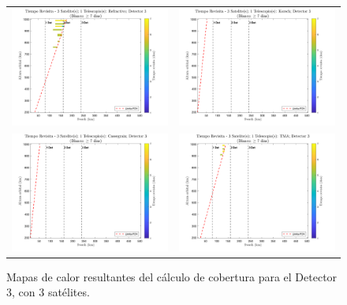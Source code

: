 \begin{landscape}
\begin{figure}[p]
\centering
\vspace*{0.3cm}
\setlength{\tabcolsep}{4pt}
\renewcommand{\arraystretch}{0}
\begin{tabular}{cc}
\includegraphics[width=0.48\linewidth]{4.Payload/Coverage/heatmap_3 Satelite(s); 1 Telescopio(s): Refractivo; Detector 3.jpg} &
\includegraphics[width=0.48\linewidth]{4.Payload/Coverage/heatmap_3 Satelite(s); 1 Telescopio(s): Korsch; Detector 3.jpg} \\
\includegraphics[width=0.48\linewidth]{4.Payload/Coverage/heatmap_3 Satelite(s); 1 Telescopio(s): Cassegrain; Detector 3.jpg} &
\includegraphics[width=0.48\linewidth]{4.Payload/Coverage/heatmap_3 Satelite(s); 1 Telescopio(s): TMA; Detector 3.jpg} \\
\end{tabular}
\caption{Mapas de calor resultantes del cálculo de cobertura para el Detector 3, con 3 satélites.}
\end{figure}
\end{landscape}


